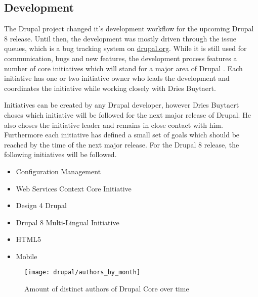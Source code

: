 \subsection{Development} %

The Drupal project changed it's development workflow for the upcoming Drupal 8
release. Until then, the development was mostly driven through the issue
queues, which is a bug tracking system on \url{drupal.org}. While it is still
used for communication, bugs and new features, the development process features
a number of core initiatives which will stand for a major area of Drupal
\cite{DrupalInitiatives}. Each initiative has one or two initiative owner who
leads the development and coordinates the initiative while working closely with
Dries Buytaert.

Initiatives can be created by any Drupal developer, however Dries Buytaert
choses which initiative will be followed for the next major release of Drupal.
He also choses the initiative leader and remains in close contact with him.
Furthermore each initiative has defined a small set of goals which should be
reached by the time of the next major release. For the Drupal 8 release, the
following initiatives will be followed.

\begin{itemize}
  \item Configuration Management
  \item Web Services Context Core Initiative
  \item Design 4 Drupal
  \item Drupal 8 Multi-Lingual Initiative
  \item HTML5
  \item Mobile
\end{itemize}

\begin{figure}[htbp]
  \centering
  \texttt{[image: drupal/authors\_by\_month]}
  \caption{Amount of distinct authors of Drupal Core over time}
\end{figure}


